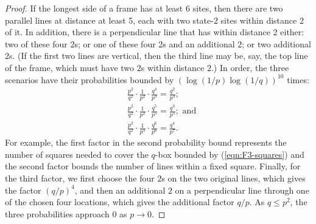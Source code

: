 \documentclass[10pt,a4paper]{amsart}
\begin{document}
\begin{proof}



    If the longest side of a frame has at least 6 sites, then there are two parallel lines at distance at least 5, each with two state-$2$ sites within distance 2 of it. In addition, there is a perpendicular line that has within distance 2 either: 
    two of these four $2$s;
    or one of these four 2s and an additional $2$; or two additional $2$s. (If the first two lines are vertical, then the third line may be, say, the top line of the frame, which must have two $2$s within distance $2$.) In order, the three scenarios have their probabilities bounded by $(\log(1/p)\log(1/q))^{10}$ times: 
    \begin{equation*}
        \begin{aligned}
         &\frac{p^2}{q^2} \cdot \frac{1}{p^2} \cdot  \frac{q^4}{p^3}=
    \frac{q^2}{p^3};\\
    &
    \frac{p^2}{q^2} \cdot \frac{1}{p^2} \cdot  \frac{q^5}{p^5}=
    \frac{q^3}{p^5}; \text{ and}
    \\&
    \frac{p^2}{q^2} \cdot \frac{1}{p^3} \cdot  \frac{q^6}{p^6}=
    \frac{q^4}{p^7}.   
        \end{aligned}
    \end{equation*}
   For example, the first factor in the second probability bound 
   represents the number of squares needed to cover the $q$-box bounded by (\ref{eqn:F3-squares}) and the second factor bounds the number of lines within a fixed square. Finally, for the third factor, we first choose the four $2$s on the two original lines, which gives the factor $(q/p)^4$, and then an additional $2$ on a perpendicular line through one of the chosen four locations, which gives the additional factor $q/p$. 
    As $q\le p^2$, the three probabilities approach $0$ as $p\to 0$.   
\end{proof}
\end{document}
